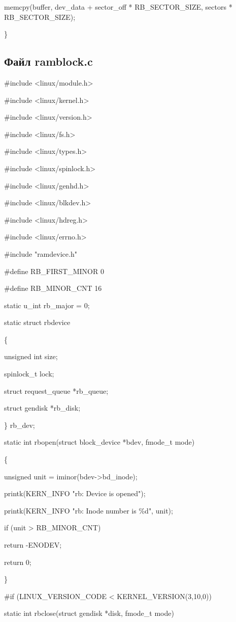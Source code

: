 \documentclass[11pt]{article}
\begin{document}
	memcpy(buffer, dev\_data + sector\_off * RB\_SECTOR\_SIZE,
		sectors * RB\_SECTOR\_SIZE);
		
\}

\subsection{Файл ramblock.c}

\#include <linux/module.h>

\#include <linux/kernel.h>

\#include <linux/version.h>

\#include <linux/fs.h>

\#include <linux/types.h>

\#include <linux/spinlock.h>

\#include <linux/genhd.h> 

\#include <linux/blkdev.h> 

\#include <linux/hdreg.h> 

\#include <linux/errno.h>


\#include "ramdevice.h"

\#define RB\_FIRST\_MINOR 0

\#define RB\_MINOR\_CNT 16

static u\_int rb\_major = 0;


static struct rbdevice

\{

	unsigned int size;
	
	spinlock\_t lock;
	
	struct request\_queue *rb\_queue;
	
	struct gendisk *rb\_disk;
	
\} rb\_dev;

static int rbopen(struct block\_device *bdev, fmode\_t mode)

\{

	unsigned unit = iminor(bdev->bd\_inode);

	printk(KERN\_INFO "rb: Device is opened\n");
	
	printk(KERN\_INFO "rb: Inode number is \%d\n", unit);

	if (unit > RB\_MINOR\_CNT)
	
		return -ENODEV;
		
	return 0;
	
\}

\#if (LINUX\_VERSION\_CODE < KERNEL\_VERSION(3,10,0))

static int rbclose(struct gendisk *disk, fmode\_t mode)
\end{document}

